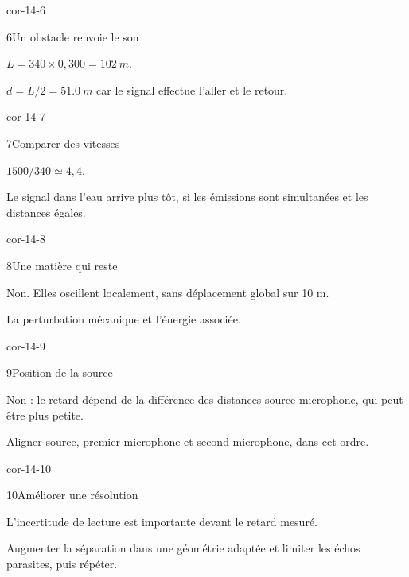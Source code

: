 \begin{blocLivre}{cor-14-6}\begin{corrige}{6}{Un obstacle renvoie le son}
\begin{questions}
\item $L=340\times0,300=\qty{102}{m}$.
\item $d=L/2=\qty{51,0}{m}$ car le signal effectue l’aller et le retour.
\end{questions}
\end{corrige}\end{blocLivre}
\begin{blocLivre}{cor-14-7}\begin{corrige}{7}{Comparer des vitesses}
\begin{questions}
\item $1500/340\simeq4,4$.
\item Le signal dans l’eau arrive plus tôt, si les émissions sont simultanées et les distances égales.
\end{questions}
\end{corrige}\end{blocLivre}
\begin{blocLivre}{cor-14-8}\begin{corrige}{8}{Une matière qui reste}
\begin{questions}
\item Non. Elles oscillent localement, sans déplacement global sur 10 m.
\item La perturbation mécanique et l’énergie associée.
\end{questions}
\end{corrige}\end{blocLivre}
\begin{blocLivre}{cor-14-9}\begin{corrige}{9}{Position de la source}
\begin{questions}
\item Non : le retard dépend de la différence des distances source-microphone, qui peut être plus petite.
\item Aligner source, premier microphone et second microphone, dans cet ordre.
\end{questions}
\end{corrige}\end{blocLivre}
\begin{blocLivre}{cor-14-10}\begin{corrige}{10}{Améliorer une résolution}
\begin{questions}
\item L’incertitude de lecture est importante devant le retard mesuré.
\item Augmenter la séparation dans une géométrie adaptée et limiter les échos parasites, puis répéter.
\end{questions}
\end{corrige}\end{blocLivre}
